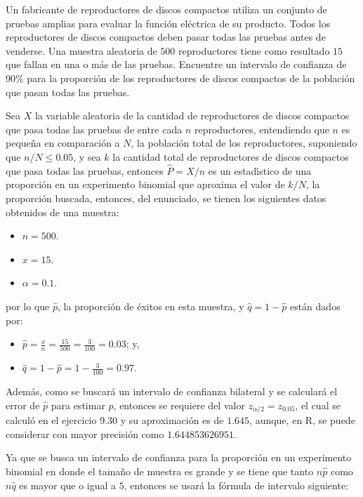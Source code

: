 \begin{enunciado}
 Un fabricante de reproductores de discos compactos utiliza un conjunto de pruebas amplias para evaluar la funci\'on el\'ectrica de su producto. Todos los reproductores de discos compactos deben pasar todas las pruebas antes de venderse. Una muestra aleatoria de $500$ reproductores tiene como resultado $15$ que fallan en una o m\'as de las pruebas. Encuentre un intervalo de confianza de $90\%$ para la proporci\'on de los reproductores de discos compactos de la poblaci\'on que pasan todas las pruebas.
\end{enunciado}

\begin{solucion}
 Sea $X$ la variable aleatoria de la cantidad de reproductores de discos compactos que pasa todas las pruebas de entre cada $n$ reproductores, entendiendo que $n$ es peque\~na en comparaci\'on a $N$, la poblaci\'on total de los reproductores, suponiendo que $n/N \leq 0.05$, y sea $k$ la cantidad total de reproductores de discos compactos que pasa todas las pruebas, entonces $\widehat{P} = X/n$ es un estad\'{\i}stico de una proporci\'on en un experimento binomial que aproxima el valor de $k/N$, la proporci\'on buscada, entonces, del enunciado, se tienen los siguientes datos obtenidos de una muestra:
 \begin{itemize}
  \item $n=500$.
  \item $x=15$.
  \item $\alpha=0.1$.
 \end{itemize}
 por lo que $\hat{p}$, la proporci\'on de \'exitos en esta muestra, y $\hat{q} = 1 -\hat{p}$ est\'an dados por:
 \begin{itemize}
  \item $\hat{p} = \frac{x}{n} = \frac{15}{500} = \frac{3}{100} = 0.03$; y,
  \item $\hat{q} = 1 - \hat{p} = 1 - \frac{3}{100} = 0.97$.
 \end{itemize}
 Adem\'as, como se buscar\'a un intervalo de confianza bilateral y se calcular\'a el error de $\hat{p}$ para estimar $p$, entonces se requiere del valor $z_{\alpha/2} = z_{0.05}$, el cual se calcul\'o en el ejercicio 9.30 y su aproximaci\'on es de $1.645$, aunque, en R, se puede considerar con mayor precisi\'on como $1.644853626951$.
 \par 
 Ya que se busca un intervalo de confianza para la proporci\'on en un experimento binomial en donde el tama\~no de muestra es grande y se tiene que tanto $n\hat{p}$ como $n\hat{q}$ es mayor que o igual a $5$, entonces se usar\'a la f\'ormula de intervalo siguiente:

\end{solucion}
